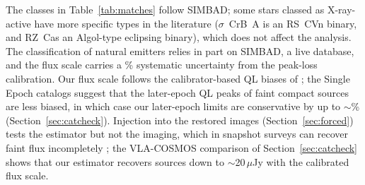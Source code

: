 \documentclass[linenumbers]{aastex702}
\begin{document}
The classes in Table~\ref{tab:matches} follow SIMBAD; some stars classed as X-ray-active have more specific types in the literature ($\sigma$~CrB~A is an RS~CVn binary, and RZ~Cas an Algol-type eclipsing binary), which does not affect the analysis. The classification of natural emitters relies in part on SIMBAD, a live database, and the flux scale carries a \KappaSys\% systematic uncertainty from the peak-loss calibration. Our flux scale follows the calibrator-based QL biases of \citet{Kimball2026}; the Single Epoch catalogs suggest that the later-epoch QL peaks of faint compact sources are less biased, in which case our later-epoch limits are conservative by up to $\sim$\XcSEcons\% (Section~\ref{sec:catcheck}). Injection into the restored images (Section~\ref{sec:forced}) tests the estimator but not the imaging, which in snapshot surveys can recover faint flux incompletely \citep{White2007}; the VLA-COSMOS comparison of Section~\ref{sec:catcheck} shows that our estimator recovers sources down to $\sim$20\,$\mu$Jy with the calibrated flux scale.
\end{document}
